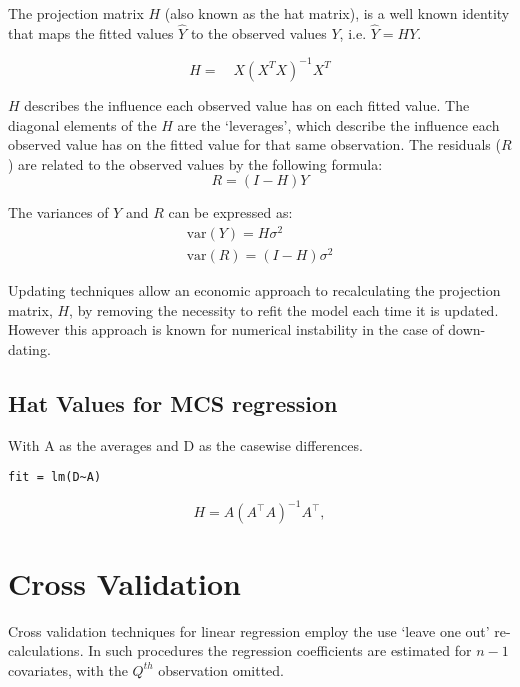 \documentclass[12pt, a4paper]{report}
\theoremstyle{plain}
\theoremstyle{definition}
\theoremstyle{remark}
\begin{document}
The projection matrix $H$ (also known as the hat matrix), is a
well known identity that maps the fitted values $\hat{Y}$ to the
observed values $Y$, i.e. $\hat{Y} = HY$.


\begin{equation}
H =\quad X(X^{T}X)^{-1}X^{T}
\end{equation}


$H$ describes the influence each observed value has on each fitted value. The diagonal elements of the $H$ are the `leverages', which describe the influence each observed value has on the fitted value for that same observation. The residuals ($R$) are related to the observed values by the following formula:
\begin{equation}
R = (I-H)Y
\end{equation}


The variances of $Y$ and $R$ can be expressed as:
\begin{eqnarray}
\mbox{var}(Y) = H\sigma^{2} \nonumber\\
\mbox{var}(R) = (I-H)\sigma^{2}
\end{eqnarray}


Updating techniques allow an economic approach to recalculating the projection matrix, $H$, by removing the necessity to refit the model each time it is updated. However this approach is known for
numerical instability in the case of down-dating.






\subsection{Hat Values for MCS regression}


With A as the averages and D as the casewise differences.
\begin{verbatim}
fit = lm(D~A)
\end{verbatim}


\begin{displaymath}
H = A \left(A^\top  A\right)^{-1} A^\top ,
\end{displaymath}


\newpage
\section{Cross Validation} %


Cross validation techniques for linear regression employ the use `leave one out' re-calculations. In such procedures the regression coefficients are estimated for $n-1$ covariates, with the $Q^{th}$ observation omitted.
\end{document}
